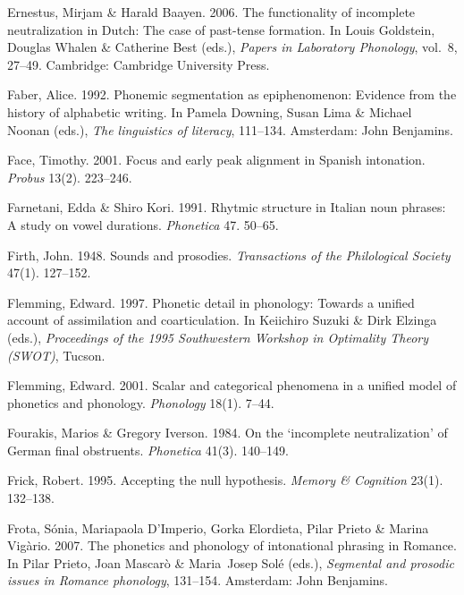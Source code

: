 \documentclass[ number=1
,series=labphon
,output=long
,url=http://langsci-press.org/catalog/book/16
,isbn=978-3-944675-01-5
]{LSP/langsci}
\begin{document}
\begin{thebibliography}{284}
Ernestus, Mirjam \& Harald Baayen. 2006.
\newblock The functionality of incomplete neutralization in {D}utch: {T}he case
  of past-tense formation.
\newblock In Louis Goldstein, Douglas Whalen \& Catherine Best (eds.),
  \emph{Papers in {L}aboratory {P}honology}, vol.~8, 27--49. Cambridge:
  Cambridge University Press.

Faber, Alice. 1992.
\newblock Phonemic segmentation as epiphenomenon: {E}vidence from the history
  of alphabetic writing.
\newblock In Pamela Downing, Susan Lima \& Michael Noonan (eds.), \emph{The
  linguistics of literacy}, 111--134. Amsterdam: John Benjamins.

Face, Timothy. 2001.
\newblock Focus and early peak alignment in {S}panish intonation.
\newblock \emph{Probus} 13(2). 223--246.

Farnetani, Edda \& Shiro Kori. 1991.
\newblock Rhytmic structure in {I}talian noun phrases: {A} study on vowel
  durations.
\newblock \emph{Phonetica} 47. 50--65.

Firth, John. 1948.
\newblock Sounds and prosodies.
\newblock \emph{Transactions of the Philological Society} 47(1). 127--152.

Flemming, Edward. 1997.
\newblock Phonetic detail in phonology: {T}owards a unified account of
  assimilation and coarticulation.
\newblock In Keiichiro Suzuki \& Dirk Elzinga (eds.), \emph{Proceedings of the
  1995 {Southwestern Workshop in Optimality Theory (SWOT)}}, Tucson.

Flemming, Edward. 2001.
\newblock Scalar and categorical phenomena in a unified model of phonetics and
  phonology.
\newblock \emph{Phonology} 18(1). 7--44.

Fourakis, Marios \& Gregory Iverson. 1984.
\newblock On the ‘incomplete neutralization’ of {G}erman final obstruents.
\newblock \emph{Phonetica} 41(3). 140--149.

Frick, Robert. 1995.
\newblock Accepting the null hypothesis.
\newblock \emph{Memory \& Cognition} 23(1). 132--138.

Frota, Sónia, Mariapaola D'Imperio, Gorka Elordieta, Pilar Prieto \& Marina
  Vig\`{a}rio. 2007.
\newblock The phonetics and phonology of intonational phrasing in {R}omance.
\newblock In Pilar Prieto, Joan Mascar\`{o} \& Maria~Josep Sol\'{e} (eds.),
  \emph{Segmental and prosodic issues in {R}omance phonology}, 131--154.
  Amsterdam: John Benjamins.


\end{thebibliography}
\end{document}
